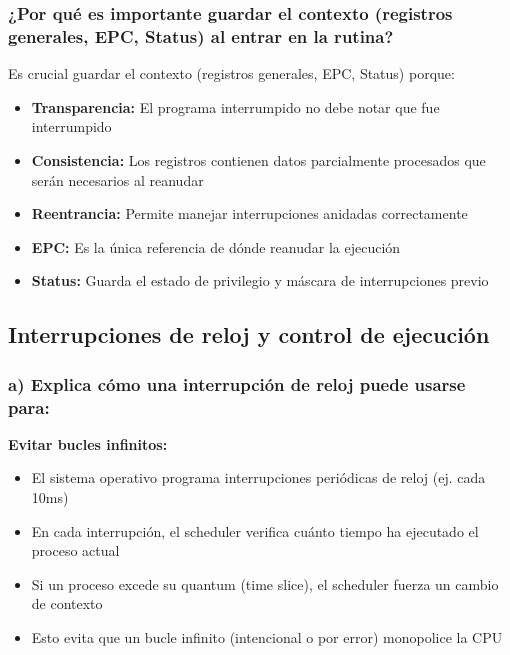 \documentclass[12pt]{article}
\begin{document}
\subsubsection{¿Por qué es importante guardar el contexto (registros generales, EPC, Status) al entrar en la rutina?}

Es crucial guardar el contexto (registros generales, EPC, Status) porque:
\begin{itemize}
	\item \textbf{Transparencia:} El programa interrumpido no debe notar que fue interrumpido
	\item \textbf{Consistencia:} Los registros contienen datos parcialmente procesados que serán necesarios al reanudar
	\item \textbf{Reentrancia:} Permite manejar interrupciones anidadas correctamente
	\item \textbf{EPC:} Es la única referencia de dónde reanudar la ejecución
	\item \textbf{Status:} Guarda el estado de privilegio y máscara de interrupciones previo
\end{itemize}

\subsection{Interrupciones de reloj y control de ejecución}

\subsubsection{a) Explica cómo una interrupción de reloj puede usarse para:}

\textbf{Evitar bucles infinitos:}
\begin{itemize}
	\item El sistema operativo programa interrupciones periódicas de reloj (ej. cada 10ms)
	\item En cada interrupción, el scheduler verifica cuánto tiempo ha ejecutado el proceso actual
	\item Si un proceso excede su quantum (time slice), el scheduler fuerza un cambio de contexto
	\item Esto evita que un bucle infinito (intencional o por error) monopolice la CPU
\end{itemize}
\end{document}

